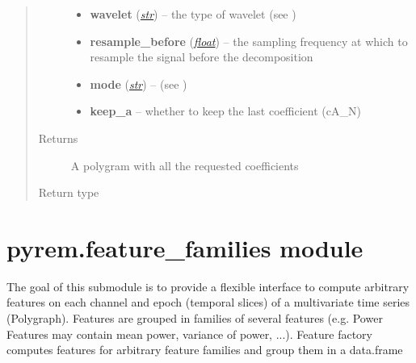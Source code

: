 \documentclass[letterpaper,10pt,english]{sphinxmanual}
\begin{document}
\begin{fulllineitems}
\begin{quote}
\begin{description}
\begin{itemize}
\item {} 
\textbf{wavelet} (\href{http://docs.python.org/2.7/library/functions.html\#str}{\emph{str}}) -- the type of wavelet (see \href{http://www.pybytes.com/pywavelets/ref/dwt-discrete-wavelet-transform.html\#pywt.wavedec}{})

\item {} 
\textbf{resample\_before} (\href{http://docs.python.org/2.7/library/functions.html\#float}{\emph{float}}) -- the sampling frequency at which to resample the signal before the decomposition

\item {} 
\textbf{mode} (\href{http://docs.python.org/2.7/library/functions.html\#str}{\emph{str}}) -- (see \href{http://www.pybytes.com/pywavelets/ref/dwt-discrete-wavelet-transform.html\#pywt.wavedec}{})

\item {} 
\textbf{keep\_a} -- whether to keep the last coefficient (cA\_N)

\end{itemize}

\item[{Returns}] \leavevmode
A polygram with all the requested coefficients

\item[{Return type}] \leavevmode
{\hyperref[pyrem.polygram:pyrem.polygram.Polygram]{}}

\end{description}\end{quote}

\end{fulllineitems}



\section{pyrem.feature\_families module}
\label{pyrem.feature_families:pyrem-feature-families-module}\label{pyrem.feature_families::doc}\label{pyrem.feature_families:module-pyrem.feature_families}
The goal of this submodule is to provide a flexible interface to compute arbitrary features on each channel and epoch (temporal slices) of a multivariate time series (Polygraph).
Features are grouped in families of several features (e.g. Power Features may contain mean power, variance of power, ...).
Feature factory computes features for arbitrary feature families and group them in a data.frame
\end{document}
